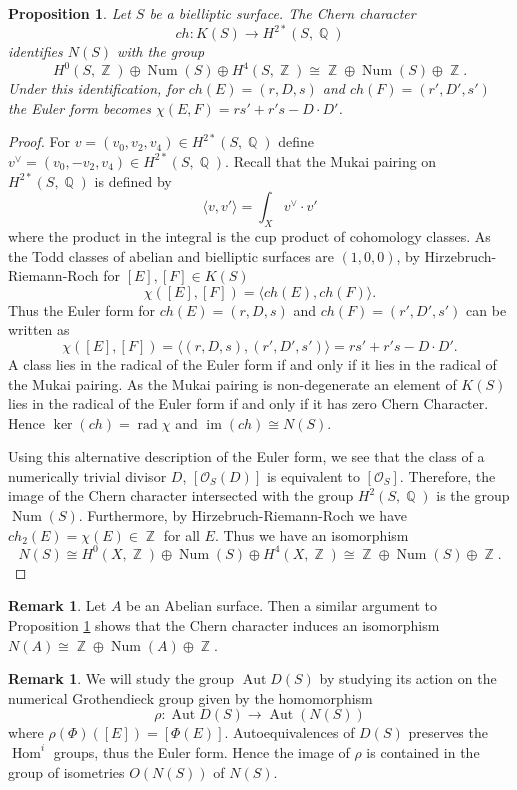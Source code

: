 \documentclass[a4paper, 12pt, twoside]{amsart}
\theoremstyle{plain}
\newtheorem{proposition}[theorem]{Proposition}
\theoremstyle{definition}
\newtheorem{remark}[theorem]{Remark}
\DeclareMathOperator{\Hom}{Hom}
\DeclareMathOperator{\iso}{\cong}
\DeclareMathOperator{\num}{Num}
\DeclareMathOperator{\im}{im}
\DeclareMathOperator{\Aut}{Aut}
\DeclareMathOperator{\rad}{rad}
\DeclareMathOperator{\Z}{\mathbb{Z}}
\DeclareMathOperator{\Q}{\mathbb{Q}}
\begin{document}
\begin{proposition}\label{prop:num_groth_bielliptic}
  Let $S$ be a bielliptic surface. The Chern character
\[
ch \colon K(S) \to H^{2*}(S, \Q)
\]
identifies $N(S)$ with the group
\[
  H^0(S,\Z) \oplus \num(S) \oplus H^4(S,\Z) \iso \Z \oplus
  \num(S) \oplus \Z.
\]
Under this identification, for $ch(E) = (r,D,s)$ and
$ch(F) = (r',D',s')$ the Euler form becomes
$\chi(E,F) = rs' + r's - D \cdot D'$.
\end{proposition}
\begin{proof}

  For $v = (v_0,v_2,v_4) \in H^{2*}(S, \Q)$ define
  $v^{\vee} = (v_0, -v_2, v_4) \in H^{2*}(S,\Q)$. Recall that the
  Mukai pairing on $H^{2*}(S,\Q)$ is defined by
\[
\langle v, v'\rangle = \int_X v^{\vee} \cdot v'
\]
where the product in the integral is the cup product of cohomology
classes. As the Todd classes of abelian and bielliptic surfaces are
$(1,0,0)$, by Hirzebruch-Riemann-Roch for $[E],[F] \in K(S)$
\[
  \chi([E],[F]) = \langle ch(E),ch(F) \rangle.
\]
Thus the Euler form for $ch(E) = (r,D,s)$ and
$ch(F) = (r',D',s')$ can be written as
\[
  \chi([E],[F]) = \langle (r,D,s), (r',D',s') \rangle = rs' + r's - D
  \cdot D'.
\]
A class lies in the radical of the Euler form if and only if it lies
in the radical of the Mukai pairing. As the Mukai pairing is
non-degenerate an element of $K(S)$ lies in the radical of the Euler
form if and only if it has zero Chern Character. Hence
$\ker(ch) = \rad \chi$ and $\im(ch) \iso N(S)$.

Using this alternative description of the Euler form, we see that
the class of a numerically trivial divisor $D$, $[\mathcal{O}_S(D)]$
is equivalent to $[\mathcal{O}_S]$. Therefore, the image of the Chern
character intersected with the group $H^2(S,\Q)$ is the group
$\num(S)$. Furthermore, by
Hirzebruch-Riemann-Roch we have $ch_2(E) = \chi(E) \in \Z$ for all
$E$. Thus we have an isomorphism
\[ 
N(S) \iso H^0(X,\Z) \oplus \num(S) \oplus H^4(X,\Z) \iso \Z \oplus
\num(S) \oplus \Z.
\]
\end{proof}

\begin{remark}
  Let $A$ be an Abelian surface. Then a similar argument to
  Proposition \ref{prop:num_groth_bielliptic} shows that the Chern
  character induces an isomorphism
  $N(A) \iso \Z \oplus \num(A) \oplus \Z$.
\end{remark}

\begin{remark}
We will study the group $\Aut D(S)$ by studying its
action on the numerical Grothendieck group given by the homomorphism
\begin{equation*}
  \rho \colon \Aut D(S) \to \Aut(N(S))
\end{equation*}
where $\rho(\Phi)([E]) = [\Phi(E)]$. Autoequivalences of $D(S)$
preserves the $\Hom^i$ groups, thus the Euler form. Hence the image of
$\rho$ is contained in the group of isometries $O(N(S))$ of $N(S)$.
\end{remark}
\end{document}
